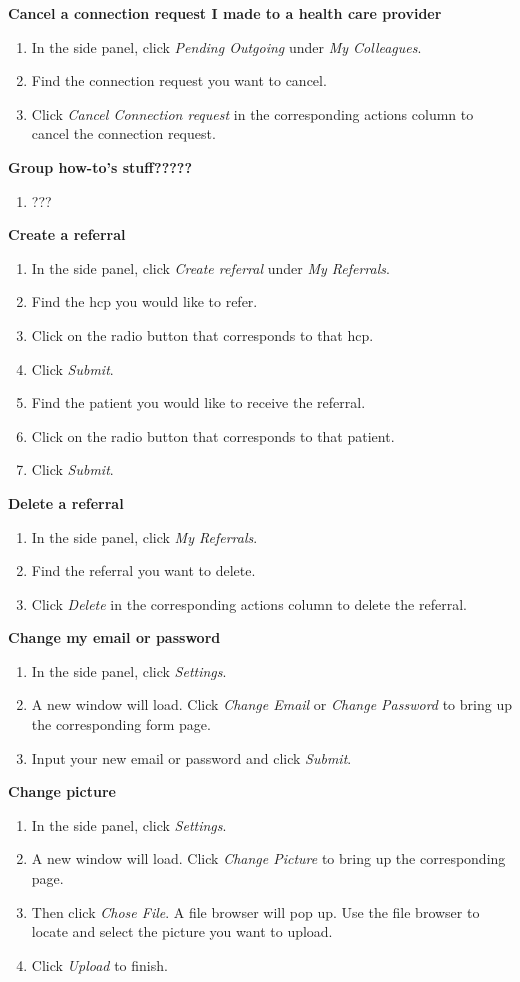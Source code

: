 \textbf{Cancel a connection request I made to a health care provider}
\begin{enumerate}
\item In the side panel, click \textit{Pending Outgoing} under \textit{My Colleagues}.
\item Find the connection request you want to cancel.
\item Click \textit{Cancel Connection request} in the corresponding actions column to cancel the connection request.
\end{enumerate}
\textbf{Group how-to's stuff?????}
\begin{enumerate}
\item ???
\end{enumerate}
\textbf{Create a referral}
\begin{enumerate}
\item In the side panel, click \textit{Create referral} under \textit{My Referrals}.
\item Find the hcp you would like to refer.
\item Click on the radio button that corresponds to that hcp.
\item Click \textit{Submit}.
\item Find the patient you would like to receive the referral.
\item Click on the radio button that corresponds to that patient.
\item Click \textit{Submit}.
\end{enumerate}
\textbf{Delete a referral}
\begin{enumerate}
\item In the side panel, click \textit{My Referrals}.
\item Find the referral you want to delete.
\item Click \textit{Delete} in the corresponding actions column to delete the referral.
\end{enumerate}
\textbf{Change my email or password}
\begin{enumerate}
\item In the side panel, click \textit{Settings}.
\item A new window will load. Click \textit{Change Email} or \textit{Change Password} to bring up the corresponding form page.
\item Input your new email or password and click \textit{Submit}.
\end{enumerate}
\textbf{Change picture}
\begin{enumerate}
\item In the side panel, click \textit{Settings}.
\item A new window will load. Click \textit{Change Picture} to bring up the corresponding page.
\item Then click \textit{Chose File}. A file browser will pop up. Use the file browser to locate and select the picture you want to upload.
\item Click \textit{Upload} to finish.
\end{enumerate}
